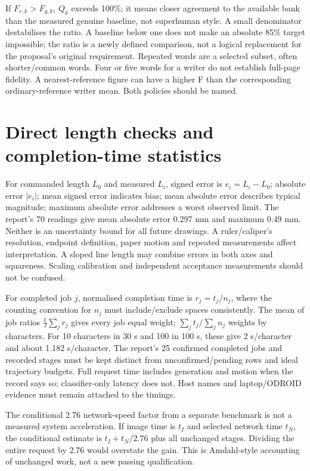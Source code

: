 If $F_{r,k}>F_{g,k}$, $Q_k$ exceeds 100\%; it means closer agreement to
the available bank than the measured genuine baseline, not superhuman style.
A small denominator destabilises the ratio. A baseline below one does not
make an absolute 85\% target impossible; the ratio is a newly defined
comparison, not a logical replacement for the proposal's original requirement.
Repeated words are a selected subset, often shorter/common words. Four or
five words for a writer do not establish full-page fidelity. A nearest-reference
figure can have a higher F than the corresponding ordinary-reference writer
mean. Both policies should be named.

\section{Direct length checks and completion-time statistics}
For commanded length $L_0$ and measured $L_i$, signed error is $e_i=L_i-L_0$;
absolute error $|e_i|$; mean signed error indicates bias; mean absolute error
describes typical magnitude; maximum absolute error addresses a worst
observed limit. The report's 70 readings give mean absolute error 0.297 mm
and maximum 0.49 mm. Neither is an uncertainty bound for all future drawings.
A ruler/caliper's resolution, endpoint definition, paper motion and repeated
measurements affect interpretation. A sloped line length may combine errors
in both axes and squareness. Scaling calibration and independent acceptance
measurements should not be confused.

For completed job $j$, normalised completion time is $r_j=t_j/n_j$, where
the counting convention for $n_j$ must include/exclude spaces consistently.
The mean of job ratios $\frac1J\sum_jr_j$ gives every job equal weight;
$\sum_jt_j/\sum_jn_j$ weights by characters. For 10 characters in 30 s
and 100 in 100 s, these give 2 s/character and about 1.182 s/character.
The report's 25 confirmed completed jobs and recorded stages must be kept
distinct from unconfirmed/pending rows and ideal trajectory budgets.
Full request time includes generation and motion when the record says so;
classifier-only latency does not. Host names and laptop/ODROID evidence
must remain attached to the timings.

The conditional 2.76 network-speed factor from a separate benchmark is not
a measured system acceleration. If image time is $t_I$ and selected network
time $t_N$, the conditional estimate is $t_I+t_N/2.76$ plus all unchanged
stages. Dividing the entire request by 2.76 would overstate the gain. This
is Amdahl-style accounting of unchanged work, not a new passing qualification.

